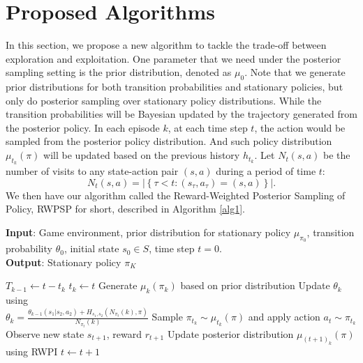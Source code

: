 \documentclass{article}
\theoremstyle{plain}
\theoremstyle{definition}
\theoremstyle{remark}
\begin{document}
\section{Proposed Algorithms}
In this section, we propose a new algorithm to tackle the trade-off between exploration and exploitation. One parameter that we need under the posterior sampling setting is the prior distribution, denoted as $\mu_{0}$. Note that we generate prior distributions for both transition probabilities and stationary policies, but only do posterior sampling over stationary policy distributions. While the transition probabilities will be Bayesian updated by the trajectory generated from the posterior policy. In each episode $k$, at each time step $t$, the action would be sampled from the posterior policy distribution. And such policy distribution $\mu_{t_{k}}(\pi)$ will be updated based on the previous history $h_{t_{k}}$. Let $N_{t}(s,a)$ be the number of visits to any state-action pair $(s,a)$ during a period of time $t$:
\begin{equation}
N_{t}(s, a)=\left|\left\{\tau<t:\left(s_{\tau}, a_{\tau}\right)=(s, a)\right\}\right|.
\end{equation}
We then have our algorithm called the Reward-Weighted Posterior Sampling of Policy, RWPSP for short, described in Algorithm \ref{alg1}.
\begin{algorithm}[ht]
\caption{Reward-Weighted Posterior Sampling of Policy (RWPSP)}
\label{alg1}
\textbf{Input}: Game environment, prior distribution for stationary policy $\mu_{\pi_{0}}$, transition probability $\theta_{0}$, initial state $s_{0} \in S$, time step $t=0$.\\
\textbf{Output}: Stationary policy $\pi_{K}$
\begin{algorithmic}[1] %
\STATE $T_{k-1} \leftarrow t-t_{k}$
\STATE $t_{k} \leftarrow t$
\STATE Generate $\mu_{k}(\pi_{k})$ based on prior distribution
\STATE Update $\theta_{k}$ using \\
$\theta_{k} = \frac{\theta_{k-1}(s_{1}|s_{2},a_{2})+H_{s_{1},s_{2}}(N_{\pi_{t}}(k),\pi)}{N_{\pi_{t}}(k)}$
\STATE Sample $\pi_{t_{k}} \sim \mu_{t_{k}}(\pi)$ and apply action $a_{t} \sim \pi_{t_{k}}$
\STATE Observe new state $s_{t+1}$, reward $r_{t+1}$
\STATE Update posterior distribution $\mu_{(t+1)_{k}}(\pi)$ using RWPI
\STATE $t \leftarrow t+1$
\ENDFOR
\ENDFOR
\end{algorithmic}
\end{algorithm}
\end{document}

